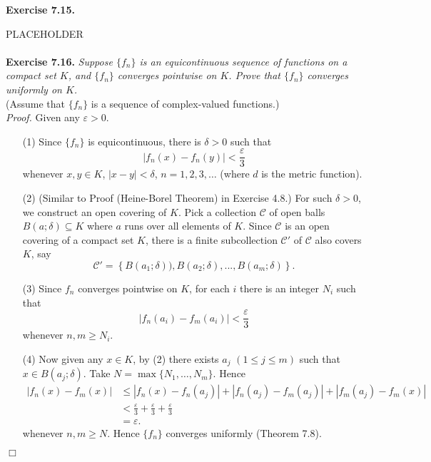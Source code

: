 \documentclass{article}
\begin{document}



\textbf{Exercise 7.15.}

PLACEHOLDER \\\\






\textbf{Exercise 7.16.}
\emph{Suppose $\{f_n\}$ is an equicontinuous sequence of functions on a compact set $K$,
and $\{f_n\}$ converges pointwise on $K$.
Prove that $\{f_n\}$ converges uniformly on $K$.} \\

(Assume that $\{f_n\}$ is a sequence of complex-valued functions.) \\

\emph{Proof.}
Given any $\varepsilon > 0$.
\begin{enumerate}
  \item[(1)]
  Since $\{f_n\}$ is equicontinuous, there is $\delta > 0$ such that
  \[
    |f_n(x) - f_n(y)| < \frac{\varepsilon}{3}
  \]
  whenever $x,y \in K$, $|x-y| < \delta$, $n = 1,2,3,\ldots$
  (where $d$ is the metric function).

  \item[(2)]
  (Similar to Proof (Heine-Borel Theorem) in Exercise 4.8.)
  For such $\delta > 0$, we construct an open covering of $K$.
  Pick a collection $\mathscr{C}$ of open balls
  $B(a;\delta) \subseteq K$
  where $a$ runs over all elements of $K$.
  Since $\mathscr{C}$ is an open covering of a compact set $K$,
  there is a finite subcollection $\mathscr{C}'$ of $\mathscr{C}$
  also covers $K$, say
  \[
    \mathscr{C}'
    = \left\{B(a_1;\delta)), B(a_2;\delta), ..., B(a_m;\delta) \right\}.
  \]

  \item[(3)]
  Since $f_n$ converges pointwise on $K$,
  for each $i$ there is an integer $N_i$ such that
  \[
    |f_n(a_i)-f_m(a_i)| < \frac{\varepsilon}{3}
  \]
  whenever $n,m \geq N_i$.

  \item[(4)]
  Now given any $x \in K$, by (2) there exists $a_j$ $(1 \leq j \leq m)$
  such that $x \in B(a_j;\delta)$.
  Take $N = \max\{N_1,\ldots,N_m\}$.
  Hence
  \begin{align*}
    |f_n(x)-f_m(x)|
    &\leq
    |f_n(x)-f_n(a_j)| + |f_n(a_j)-f_m(a_j)| + |f_m(a_j)-f_m(x)| \\
    &<
    \frac{\varepsilon}{3} + \frac{\varepsilon}{3} + \frac{\varepsilon}{3} \\
    &=
    \varepsilon.
  \end{align*}
  whenever $n,m \geq N$.
  Hence $\{f_n\}$ converges uniformly (Theorem 7.8).
\end{enumerate}
$\Box$ \\\\
\end{document}
